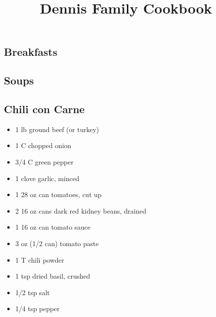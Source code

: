 \documentclass{article}
\title{Dennis Family Cookbook}
\date{}
\begin{document}
\maketitle
\tableofcontents
\newpage

\vspace*{\fill}
\begin{center}
\section{Breakfasts}
\end{center}
\vspace*{\fill}
\newpage 

\vspace*{\fill}
\begin{center}
\section{Soups}
\end{center}
\vspace*{\fill}
\newpage

\subsection{Chili con Carne} 

\begin{framed}
\begin{itemize}
\item 1 lb ground beef (or turkey)
\item 1 C chopped onion
\item 3/4 C green pepper
\item 1 clove garlic, minced
\item 1 28 oz can tomatoes, cut up
\item 2 16 oz cans dark red kidney beans, drained
\item 1 16 oz can tomato sauce
\item 3 oz (1/2 can) tomato paste
\item 1 T chili powder
\item 1 tsp dried basil, crushed
\item 1/2 tsp salt
\item 1/4 tsp pepper
\end{itemize}
\end{framed}
\end{document}
